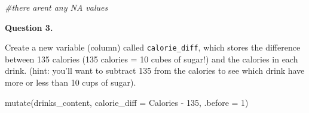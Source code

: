 \documentclass[
]{article}
\newenvironment{Shaded}{\begin{snugshade}}{\end{snugshade}}
\newcommand{\AttributeTok}[1]{\textcolor[rgb]{0.77,0.63,0.00}{#1}}
\newcommand{\CommentTok}[1]{\textcolor[rgb]{0.56,0.35,0.01}{\textit{#1}}}
\newcommand{\DecValTok}[1]{\textcolor[rgb]{0.00,0.00,0.81}{#1}}
\newcommand{\FunctionTok}[1]{\textcolor[rgb]{0.00,0.00,0.00}{#1}}
\newcommand{\NormalTok}[1]{#1}
\newcommand{\SpecialCharTok}[1]{\textcolor[rgb]{0.00,0.00,0.00}{#1}}
\begin{document}
\begin{Shaded}
\begin{Highlighting}[]
\CommentTok{\#there aren\textquotesingle{}t any NA values}
\end{Highlighting}
\end{Shaded}

\textbf{Question 3.}

Create a new variable (column) called \texttt{calorie\_diff}, which
stores the difference between 135 calories (135 calories = 10 cubes of
sugar!) and the calories in each drink. (hint: you'll want to subtract
135 from the calories to see which drink have more or less than 10 cups
of sugar).

\begin{Shaded}
\begin{Highlighting}[]
\FunctionTok{mutate}\NormalTok{(drinks\_content, }\AttributeTok{calorie\_diff =}\NormalTok{ Calories }\SpecialCharTok{{-}} \DecValTok{135}\NormalTok{, }\AttributeTok{.before =} \DecValTok{1}\NormalTok{)}
\end{Highlighting}
\end{Shaded}
\end{document}

